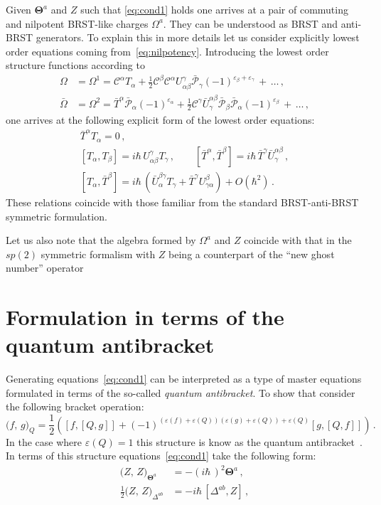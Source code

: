\documentclass[a4paper,12pt]{amsart}
\newcommand{\cC}{{\mathcal C}}
\newcommand{\bP}{\bar{\mathcal P}}
\newcommand{\myth}{\mathbf{\Theta}}
\numberwithin{equation}{section}
\def\ih{i\hbar\,}
\newcommand{\ab}[2]{\big(#1,\,#2\big)}
\newcommand{\commut}[2]{[#1,#2]}
\def\half{{\frac{1}{2}}}
\newcommand{\p}[1]{\varepsilon{(#1)}}
\newcommand{\ip}[1]{\varepsilon_{#1}}
\begin{document}
Given $\myth^a$ and $Z$ such that \eqref{eq:cond1} holds one arrives at a pair
of commuting and nilpotent BRST-like charges ${\Omega}^a$. They can be
understood as BRST and anti-BRST generators. To explain this in more details
let us consider explicitly lowest order equations coming
from~\eqref{eq:nilpotency}.
Introducing the lowest
order structure functions according to
\begin{equation}
\begin{aligned}
\label{eq:Omega-exp}
\Omega&={\Omega}^1=\cC^\alpha {T}_\alpha
+
\half \cC^\beta \cC^\alpha {U}^\gamma_{\alpha\beta}\bP_\gamma
(-1)^{\ip{\beta}+\ip{\gamma}}
\,+\,\ldots\,,
\\
\bar\Omega&=
{\Omega}^2
=
{\bar{T}}^\alpha \bP_\alpha(-1)^{\ip{\alpha}}
+
\half \cC^\gamma {\bar{U}}^{\alpha\beta}_\gamma
\bP_\beta \bP_\alpha(-1)^{\ip{\beta}}
\,+\,\ldots\,,
\end{aligned}
\end{equation}
one arrives at the following explicit form
of the lowest order equations:
\begin{gather}
\label{eq:1st-cond}
{\bar{T}}^\alpha T_\alpha =0\,,\\
\commut{T_\alpha}{T_\beta}=
i\hbar\, {U}^\gamma_{\alpha\beta}T_\gamma\,,
\qquad
\commut{{\bar{T}}^\alpha}{{\bar{T}}^\beta}=
i\hbar\,{\bar{T}}^\gamma {\bar{U}}_\gamma^{\alpha\beta}\,,\\
\commut{T_\alpha}{{\bar{T}}^\beta}
=
i\hbar\,({\bar{U}}^{\beta\gamma}_\alpha T_\gamma
+
{\bar{T}}^\gamma {U}^\beta_{\gamma\alpha})+O(\hbar^2)\,.
\end{gather}
These relations coincide with those familiar from the standard BRST-anti-BRST
symmetric formulation.

Let us also note that the algebra formed by $\Omega^a$ and $Z$
coincide with that in the $sp(2)$ symmetric formalism with
$Z$ being a counterpart of the ``new ghost number''
operator~\cite{BLT}


\section{Formulation in terms of the quantum antibracket}\label{sec:QA}
Generating equations~\eqref{eq:cond1} can be interpreted as
a type of master equations formulated in terms of the so-called
\textit{quantum antibracket}. To show that consider the
following bracket operation:
\begin{equation}
\ab{f}{g}_Q=\half
\left(
\commut{f}{\commut{Q}{g}}+(-1)^{(\p{f}+\p{Q})(\p{g}+\p{Q})+\p{Q}}
\commut{g}{\commut{Q}{f}}
\right)\,.
\end{equation}
In the case where $\p{Q}=1$ this structure is know as the
quantum antibracket~\cite{BMQA}. In terms of this structure
equations~\eqref{eq:cond1} take the following form:
\begin{equation}
  \begin{split}
\label{eq:masterZ}
\ab{Z}{Z}_{\myth^a}&=-(\ih)^2\myth^a\,,\\
\half\ab{Z}{Z}_{\Delta^{ab}}&=-\ih\commut{\Delta^{ab}}{Z}\,,
\end{split}
\end{equation}
\end{document}
